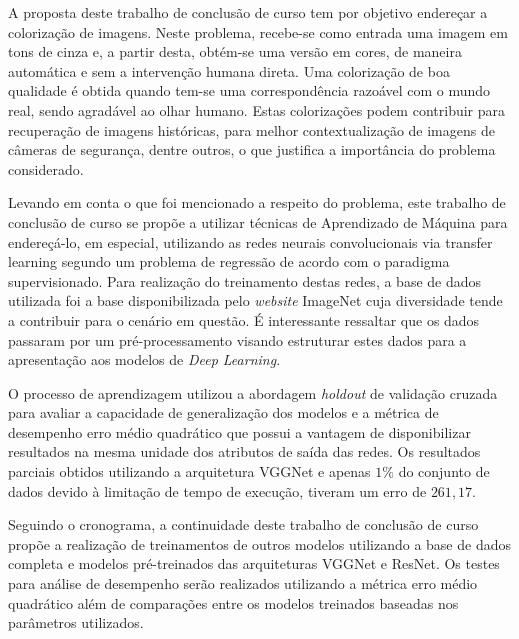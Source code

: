 \begin{comment}
A proposta deste trabalho de conclusão de curso apresenta os procedimentos necessários para endereçar o problema de colorização de imagens utilizando as técnicas de \emph{Deep Learning}. Este problema consiste em obter a coloração de imagens em tons de cinza por meio de transferência de conhecimento utilizando redes neurais convolucionais pré-treinadas e adaptadas a este cenário. 
	content...
\end{comment}

A proposta deste trabalho de conclusão de curso tem por objetivo endereçar a colorização de imagens. Neste problema, recebe-se como entrada uma imagem em tons de cinza e, a partir desta, obtém-se uma versão em cores, de maneira automática e sem a intervenção humana direta. Uma colorização de boa qualidade é obtida quando tem-se uma correspondência razoável com o mundo real, sendo agradável ao olhar humano. Estas colorizações podem contribuir para recuperação de  imagens históricas, para melhor contextualização de imagens de câmeras de segurança, dentre outros, o que justifica  a importância  do problema considerado.

Levando em conta o que foi mencionado a respeito do problema, este trabalho de conclusão de curso se propõe a utilizar técnicas de Aprendizado de Máquina para endereçá-lo, em especial, utilizando as redes neurais convolucionais via transfer learning segundo um problema de regressão de acordo com o paradigma supervisionado. Para realização do treinamento destas redes, a base de dados utilizada foi a base disponibilizada pelo \emph{website} ImageNet cuja diversidade tende a contribuir para o cenário em questão. É interessante ressaltar que os dados passaram por um pré-processamento visando estruturar estes dados para a apresentação aos modelos de \emph{Deep Learning}.

O processo de aprendizagem utilizou a abordagem \emph{holdout} de validação cruzada para avaliar a capacidade de generalização dos modelos e a métrica de desempenho erro médio quadrático que possui a vantagem de disponibilizar resultados na mesma unidade dos atributos de saída das redes. Os resultados parciais obtidos utilizando a arquitetura VGGNet e apenas $1\%$ do conjunto de dados devido à limitação de tempo de execução, tiveram um erro de $261,17$.

Seguindo o cronograma, a continuidade deste trabalho de conclusão de curso propõe a realização de treinamentos de outros modelos utilizando a base de dados completa e modelos pré-treinados das arquiteturas VGGNet e ResNet. Os testes para análise de desempenho serão realizados utilizando a métrica erro médio quadrático além de comparações entre os modelos treinados baseadas nos parâmetros utilizados.